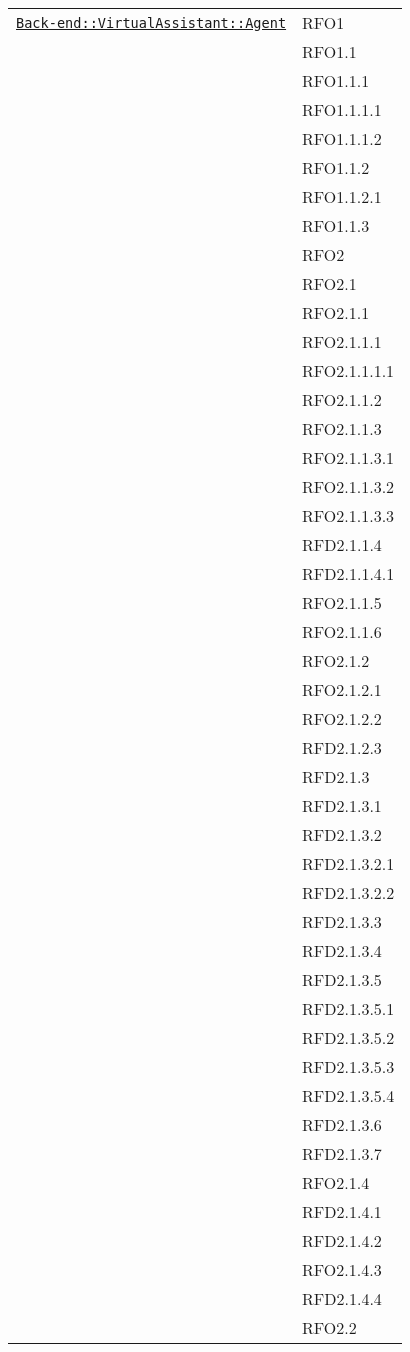 \begin{longtable}{|>{\centering}m{10cm}|m{3cm}<{\centering}|}
\hyperref[Back-end::VirtualAssistant::Agent]{\texttt{Back-end::VirtualAssistant::Agent}} & RFO1\\
& RFO1.1\\
& RFO1.1.1\\
& RFO1.1.1.1\\
& RFO1.1.1.2\\
& RFO1.1.2\\
& RFO1.1.2.1\\
& RFO1.1.3\\
& RFO2\\
& RFO2.1\\
& RFO2.1.1\\
& RFO2.1.1.1\\
& RFO2.1.1.1.1\\
& RFO2.1.1.2\\
& RFO2.1.1.3\\
& RFO2.1.1.3.1\\
& RFO2.1.1.3.2\\
& RFO2.1.1.3.3\\
& RFD2.1.1.4\\
& RFD2.1.1.4.1\\
& RFO2.1.1.5\\
& RFO2.1.1.6\\
& RFO2.1.2\\
& RFO2.1.2.1\\
& RFO2.1.2.2\\
& RFD2.1.2.3\\
& RFD2.1.3\\
& RFD2.1.3.1\\
& RFD2.1.3.2\\
& RFD2.1.3.2.1\\
& RFD2.1.3.2.2\\
& RFD2.1.3.3\\
& RFD2.1.3.4\\
& RFD2.1.3.5\\
& RFD2.1.3.5.1\\
& RFD2.1.3.5.2\\
& RFD2.1.3.5.3\\
& RFD2.1.3.5.4\\
& RFD2.1.3.6\\
& RFD2.1.3.7\\
& RFO2.1.4\\
& RFD2.1.4.1\\
& RFD2.1.4.2\\
& RFO2.1.4.3\\
& RFD2.1.4.4\\
& RFO2.2\\

\end{longtable}
